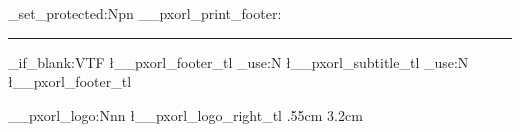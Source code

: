 \cs_set_protected:Npn \__pxorl_print_footer:
{
	\textcolor{\l__pxorl_neutral_color_tl}
	{ \rule{\linewidth}{.45pt} }

	\par\vspace{.55em}

	\noindent
	\begin{minipage}[c]{.58\linewidth}
		\raggedright
		{
			\small
			\color{\l__pxorl_text_color_tl}
			\tl_if_blank:VTF \l__pxorl_footer_tl
			{ \tl_use:N \l__pxorl_subtitle_tl }
			{ \tl_use:N \l__pxorl_footer_tl }
		}
	\end{minipage}
	\hfill
	\begin{minipage}[c]{.36\linewidth}
		\raggedleft
		\__pxorl_logo:Nnn
		\l__pxorl_logo_right_tl
		{ .55cm }
		{ 3.2cm }
	\end{minipage}
}

